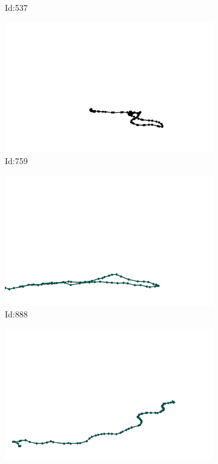 \documentclass[12pt,twoside]{report}
\begin{document}
\begin{figure}
\begin{subfigure}[b]{0.20\textwidth}
\caption{Id:537}
\end{subfigure}
\begin{subfigure}[b]{0.20\textwidth}
\centering
\includegraphics[width=\textwidth]{../trajectories/759.png}
\caption{Id:759}
\end{subfigure}
\begin{subfigure}[b]{0.20\textwidth}
\centering
\includegraphics[width=\textwidth]{../trajectories/888.png}
\caption{Id:888}
\end{subfigure}
\begin{subfigure}[b]{0.20\textwidth}
\centering
\includegraphics[width=\textwidth]{../trajectories/930.png}

\end{subfigure}
\end{figure}
\end{document}
